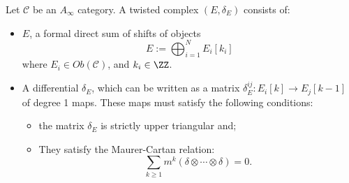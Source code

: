 
 
 
Let $\mathcal C$ be an $A_\infty$ category. A twisted complex $(E, \delta_E)$ consists of:
\begin{itemize}
\item $E$, a formal direct sum of shifts of objects
\[E:=\bigoplus_{i=1}^N E_i[k_i]\]
where $E_{i}\in Ob(\mathcal C)$, and $k_i\in \ZZ$.
\item  A differential $\delta_E$, which can be written as a matrix  $\delta^{ij}_E: E_i[k]\to E_j[k-1]$ of degree 1 maps. These maps must satisfy the following conditions:
\begin{itemize}
    \item the matrix $\delta_E$ is strictly upper triangular and;
    \item They satisfy the Maurer-Cartan relation:
    \[\sum_{k\geq 1} m^k (\delta\otimes\cdots \otimes \delta) =0.\]
\end{itemize}
\end{itemize}

 